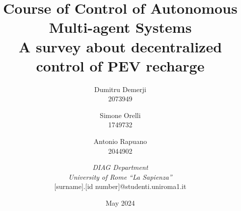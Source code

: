 \documentclass{article}
\title{\large Course of Control of Autonomous Multi-agent Systems \\ \LARGE A survey about decentralized control of PEV recharge}
\author{Dumitru Demerji \\2073949
\and Simone Orelli\\1749732 
\and Antonio Rapuano\\2044902 \and \textit{DIAG Department}\\ \textit{University of Rome “La Sapienza”}\\ $[$surname$]$.$[$id number$]$@studenti.uniroma1.it}
\date{May 2024}
\numberwithin{figure}{section}
\numberwithin{table}{section}
\numberwithin{equation}{section}
\begin{document}
    \maketitle
    \thispagestyle{empty}
    \begin{multicols}{2}
        
        \vfill\null
        \columnbreak
        \tableofcontents

        \newpage
        
        
        
        
        \printbibliography
    \end{multicols}
\end{document}
